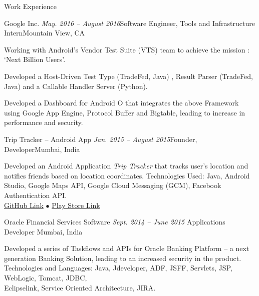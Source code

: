 \documentclass{resume} %
\begin{document}

\begin{rSection}{Work Experience}


\begin{rSubsection}{Google Inc.}{\emph{ May. 2016 -- August 2016}}{Software Engineer, Tools and Infrastructure Intern}{Mountain View, CA}
\item Working with Android's Vendor Test Suite (VTS) team to achieve the mission : `Next Billion Users'.
\item Developed a Host-Driven Test Type (TradeFed, Java) , Result Parser (TradeFed, Java) and a Callable Handler Server (Python).
\item Developed a Dashboard for Android O that integrates the above Framework using Google App Engine, Protocol Buffer and Bigtable, leading to increase in performance and security.
\end{rSubsection}


\begin{rSubsection}{Trip Tracker -- Android App}{\emph{ Jan. 2015 -- August 2015}}{Founder, Developer}{Mumbai, India}
\item Developed an Android Application {\emph{Trip Tracker}} that tracks user's  location and notifies friends based on location coordinates. 
Technologies Used: Java, Android Studio, Google Maps API, Google Cloud Messaging (GCM), Facebook Authentication API. \\
\href{https://github.com/sahil2441/Trip-Tracker}{GitHub Link}
{\tiny$\bullet$}
\href{https://play.google.com/store/apps/details?id=me.sahiljain.tripTracker}{Play Store Link}
\end{rSubsection}


\begin{rSubsection}{Oracle Financial Services Software} {\emph{Sept. 2014 -- June 2015}} {Applications Developer}
{Mumbai, India}

\item Developed a series of Taskflows and APIs for Oracle Banking Platform -- a next generation Banking Solution, leading to an increased security in the product.\\
Technologies and Languages: Java, Jdeveloper, ADF, JSFF, Servlets, JSP, WebLogic, Tomcat, JDBC, \\
Eclipselink, Service Oriented Architecture, JIRA.

\end{rSubsection}


\end{rSection}
\end{document}
